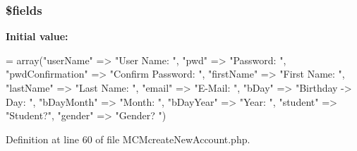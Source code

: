 \hypertarget{_m_c_mcreate_new_account_8php_ab2303c817e3b402b77b7f99627b9c319}{
\subsubsection[{\$fields}]{\setlength{\rightskip}{0pt plus 5cm}\$fields}}\label{_m_c_mcreate_new_account_8php_ab2303c817e3b402b77b7f99627b9c319}
{\bfseries Initial value\-:}
\begin{DoxyCode}
= array(\textcolor{stringliteral}{"userName"} => \textcolor{stringliteral}{"User Name: "},
                        \textcolor{stringliteral}{"pwd"} => \textcolor{stringliteral}{"Password: "},
                        \textcolor{stringliteral}{"pwdConfirmation"} => \textcolor{stringliteral}{"Confirm Password: "},
                        \textcolor{stringliteral}{"firstName"} => \textcolor{stringliteral}{"First Name: "},
                        \textcolor{stringliteral}{"lastName"} => \textcolor{stringliteral}{"Last Name: "},
                        \textcolor{stringliteral}{"email"} => \textcolor{stringliteral}{"E-Mail: "},
                        \textcolor{stringliteral}{"bDay"} => \textcolor{stringliteral}{"Birthday -> Day: "},
                        \textcolor{stringliteral}{"bDayMonth"} => \textcolor{stringliteral}{"Month: "},
                        \textcolor{stringliteral}{"bDayYear"} => \textcolor{stringliteral}{"Year: "},
                        \textcolor{stringliteral}{"student"} => \textcolor{stringliteral}{"Student?"},
                        \textcolor{stringliteral}{"gender"} => \textcolor{stringliteral}{"Gender? "})
\end{DoxyCode}


Definition at line 60 of file M\-C\-Mcreate\-New\-Account.\-php.

